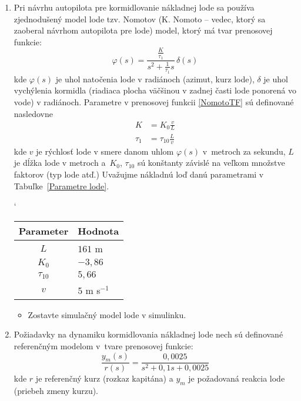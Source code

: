 \documentclass[a4paper, 10pt, ]{article}
\begin{document}
\begin{enumerate}

	\item  Pri návrhu autopilota pre kormidlovanie nákladnej lode sa používa zjednodušený model lode tzv. Nomotov (K. Nomoto -- vedec, ktorý sa zaoberal návrhom autopilota pre lode) model, ktorý má tvar prenosovej funkcie:
	\begin{equation} \label{NomotoTF}
		\varphi(s) = \frac{\frac{K}{\tau_1}}{s^2 + \frac{1}{\tau_1}s} \, \delta(s)
	\end{equation}
	kde $\varphi(s)$ je uhol natočenia lode v radiánoch (azimut, kurz lode), $\delta$ je uhol vychýlenia kormidla (riadiaca plocha väčšinou v zadnej časti lode ponorená vo vode) v radiánoch. Parametre v prenosovej funkcii \eqref{NomotoTF} sú definované nasledovne
	\begin{align}
		K &= K_0 \frac{v}{L} \\
		\tau_1 &= \tau_{10} \frac{L}{v}
	\end{align}
	kde $v$ je rýchlosť lode v smere danom uhlom $\varphi(s)$ v~metroch za sekundu, $L$ je dĺžka lode v metroch a~$K_0$, $\tau_{10}$ sú konštanty závislé na veľkom množstve faktorov (typ lode atď.) Uvažujme nákladnú loď danú parametrami v Tabuľke~\ref{Parametre lode}.

	\begin{center}
		\catcode`
		\label{Parametre lode}
		\begin{tabular}{ c l }
			\toprule
			Parameter & Hodnota \\
			\midrule
			$L$         & $161$ m \\
			$K_0$       &  $-3,86$ \\
			$\tau_{10}$ & $5,66$ \\
			$v$         &  $5$ m s$^{-1}$ \\
			\bottomrule
		\end{tabular}
	\end{center}



	\begin{itemize}
		\item Zostavte simulačný model lode v simulinku.
	\end{itemize}

	\item Požiadavky na dynamiku kormidlovania nákladnej lode nech sú definované referenčným modelom v~tvare prenosovej funkcie:
	\begin{equation}
		\frac{y_m(s)}{r(s)} = \frac{0,0025 }{s^2 + 0,1 s + 0,0025}
	\end{equation}
	kde $r$ je referenčný kurz (rozkaz kapitána) a $y_m$ je požadovaná reakcia lode (priebeh zmeny kurzu).


\end{enumerate}
\end{document}
